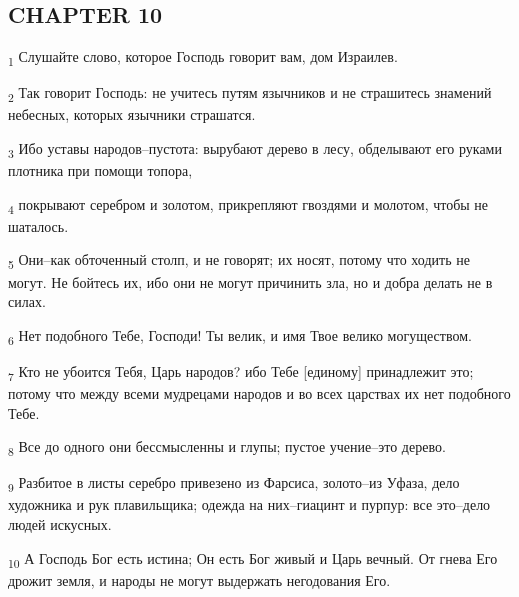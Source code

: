 \subsection{CHAPTER 10}
\begin{tcolorbox}
\textsubscript{1} Слушайте слово, которое Господь говорит вам, дом Израилев.
\end{tcolorbox}
\begin{tcolorbox}
\textsubscript{2} Так говорит Господь: не учитесь путям язычников и не страшитесь знамений небесных, которых язычники страшатся.
\end{tcolorbox}
\begin{tcolorbox}
\textsubscript{3} Ибо уставы народов--пустота: вырубают дерево в лесу, обделывают его руками плотника при помощи топора,
\end{tcolorbox}
\begin{tcolorbox}
\textsubscript{4} покрывают серебром и золотом, прикрепляют гвоздями и молотом, чтобы не шаталось.
\end{tcolorbox}
\begin{tcolorbox}
\textsubscript{5} Они--как обточенный столп, и не говорят; их носят, потому что ходить не могут. Не бойтесь их, ибо они не могут причинить зла, но и добра делать не в силах.
\end{tcolorbox}
\begin{tcolorbox}
\textsubscript{6} Нет подобного Тебе, Господи! Ты велик, и имя Твое велико могуществом.
\end{tcolorbox}
\begin{tcolorbox}
\textsubscript{7} Кто не убоится Тебя, Царь народов? ибо Тебе [единому] принадлежит это; потому что между всеми мудрецами народов и во всех царствах их нет подобного Тебе.
\end{tcolorbox}
\begin{tcolorbox}
\textsubscript{8} Все до одного они бессмысленны и глупы; пустое учение--это дерево.
\end{tcolorbox}
\begin{tcolorbox}
\textsubscript{9} Разбитое в листы серебро привезено из Фарсиса, золото--из Уфаза, дело художника и рук плавильщика; одежда на них--гиацинт и пурпур: все это--дело людей искусных.
\end{tcolorbox}
\begin{tcolorbox}
\textsubscript{10} А Господь Бог есть истина; Он есть Бог живый и Царь вечный. От гнева Его дрожит земля, и народы не могут выдержать негодования Его.
\end{tcolorbox}
